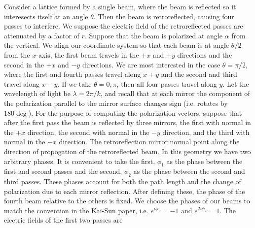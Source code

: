 \documentclass{article}
\theoremstyle{definition}
\begin{document}
Consider a lattice formed by a single beam, where the beam is reflected so it interesects itself at an angle $\theta$. Then the beam is retroreflected, causing four passes to interfere. We suppose the electric field of the retroreflected passes are attenuated by a factor of $r$. Suppose that the beam is polarized at angle $\alpha$ from the vertical. We align our coordinate system so that each beam is at angle $\theta/2$ from the $x$-axis, the first beam travels in the $+x$ and $+y$ directions and the second in the $+x$ and $-y$ directions. We are most interested in the case $\theta = \pi/2$, where the first and fourth passes travel along $x + y$ and the second and third travel along $x - y$. If we take $\theta = 0, \pi$, then all four passes travel along $y$. Let the wavelength of light be $\lambda = 2\pi/k$, and recall that at each mirror the component of the polarization parallel to the mirror surface changes sign (i.e. rotates by $180 \deg$). For the purpose of computing the polarization vectors, suppose that after the first pass the beam is reflected by three mirrors, the first with normal in the $+x$ direction, the second with normal in the $-y$ direction, and the third with normal in the $-x$ direction. The retroreflection mirror normal point along the direction of propogation of the retroreflected beam. In this geometry we have two arbitrary phases. It is convenient to take the first, $\phi_1$ as the phase between the first and second passes and the second, $\phi_2$ as the phase between the second and third passes. These phases account for both the path length and the change of polarization due to each mirror reflection. After defining these, the phase of the fourth beam relative to the others is fixed. We choose the phases of our beams to match the convention in the Kai-Sun paper, i.e. $e^{i\phi_1} = -1$ and $e^{2i\phi_2} = 1$. The electric fields of the first two passes are
\end{document}
